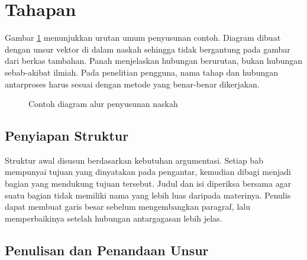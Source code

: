 \section{Tahapan}

Gambar \ref{fig:contoh-alur} menunjukkan urutan umum penyusunan contoh. Diagram dibuat dengan unsur vektor di dalam naskah sehingga tidak bergantung pada gambar dari berkas tambahan. Panah menjelaskan hubungan berurutan, bukan hubungan sebab-akibat ilmiah. Pada penelitian pengguna, nama tahap dan hubungan antarproses harus sesuai dengan metode yang benar-benar dikerjakan.

\begin{figure}[htbp]
  \centering
  \caption{Contoh diagram alur penyusunan naskah}
  \label{fig:contoh-alur}
\end{figure}

\subsection{Penyiapan Struktur}

Struktur awal disusun berdasarkan kebutuhan argumentasi. Setiap bab mempunyai tujuan yang dinyatakan pada pengantar, kemudian dibagi menjadi bagian yang mendukung tujuan tersebut. Judul dan isi diperiksa bersama agar suatu bagian tidak memiliki nama yang lebih luas daripada materinya. Penulis dapat membuat garis besar sebelum mengembangkan paragraf, lalu memperbaikinya setelah hubungan antargagasan lebih jelas.

\subsection{Penulisan dan Penandaan Unsur}

